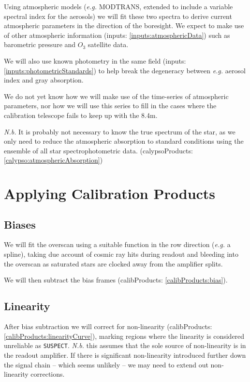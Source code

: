 \documentclass[12pt]{article}
\newcommand{\eg}{\textit{e.g.}\xspace}
\newcommand{\Nb}{\textit{N.b.}\xspace}
\newcommand{\inputData}[1]{(inputs: \ref{inputs:#1})}
\newcommand{\outputData}[1]{(calibProducts: \ref{calibProducts:#1})}
\newcommand{\calypsoData}[1]{(calypsoProducts: \ref{calypso:#1})}
\begin{document}
Using atmospheric models (\eg MODTRANS, extended to include a variable spectral index for the aerosols)
we will fit these two spectra to derive current atmospheric parameters in the direction of the boresight.
We expect to make use of other atmospheric information \inputData{atmosphericData} such as barometric pressure
and $O_3$ satellite data.

We will also use known photometry in the same field \inputData{photometricStandards} to help break the
degeneracy between \eg aerosol index and gray absorption.

We do not yet know how we will make use of the time-series of atmospheric parameters, nor how we will
use this series to fill in the cases where the calibration telescope fails to keep up with the 8.4m.

\Nb It is probably not necessary to know the true spectrum of the star, as we only need to reduce the
atmospheric absorption to standard conditions using the ensemble of all star spectrophotometric data.
\calypsoData{atmosphericAbsorption}

\section{Applying Calibration Products}

\subsection{Biases}

We will fit the overscan using a suitable function in the row direction (\eg a spline), taking
due account of cosmic ray hits during readout and bleeding into the overscan as saturated
stars are clocked away from the amplifier splits.

We will then subtract the bias frames \outputData{bias}.

\subsection{Linearity}

After bias subtraction we will correct for non-linearity \outputData{linearityCurve}, marking
regions where the linearity is considered unreliable as \texttt{SUSPECT}.
\Nb this assumes that the sole
source of non-linearity is in the readout amplifier.  If there is significant non-linearity
introduced further down the signal chain -- which seems unlikely -- we may need to extend
out non-linearity corrections.
\end{document}
